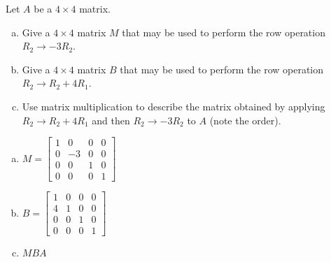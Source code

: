 
\begin{exerciseStatement}


Let \(A\) be a \(4 \times 4\) matrix.


\begin{enumerate}[(a)]
\item Give a \(4 \times 4\) matrix \(M\) that may be used to perform the row operation \( R_2 \to -3R_2 \).
\item Give a \(4 \times 4\) matrix \(B\) that may be used to perform the row operation \( R_2 \to R_2 + 4R_1 \).
\item Use matrix multiplication to describe the matrix obtained by applying \( R_2 \to R_2 + 4R_1 \) and then \( R_2 \to -3R_2 \) to \(A\) (note the order). 
\end{enumerate}
    
\end{exerciseStatement}
    
\begin{exerciseAnswer} 

\begin{enumerate}[(a)]
\item \(M= \left[\begin{array}{cccc}
1 & 0 & 0 & 0 \\
0 & -3 & 0 & 0 \\
0 & 0 & 1 & 0 \\
0 & 0 & 0 & 1
\end{array}\right] \)
\item \(B= \left[\begin{array}{cccc}
1 & 0 & 0 & 0 \\
4 & 1 & 0 & 0 \\
0 & 0 & 1 & 0 \\
0 & 0 & 0 & 1
\end{array}\right] \)
\item \(MBA\)
\end{enumerate}
    
\end{exerciseAnswer}
    
